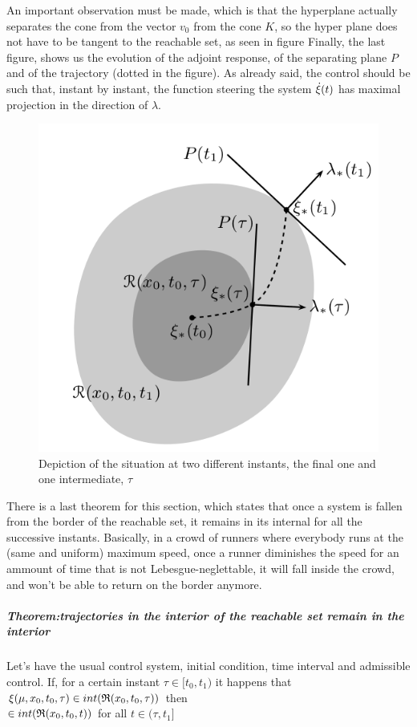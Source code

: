 An important observation must be made, which is that the hyperplane actually separates the cone from the vector $v_0$ from the cone $K$, so the hyper plane does not have to be tangent to the reachable set, as seen in figure %
Finally, the last figure, shows us the evolution of the adjoint response, of the separating plane $P$ and of the trajectory (dotted in the figure). As already said, the control should be such that, instant by instant, the function steering the system $\dot{\xi}(t)$ has maximal projection in the direction of $\lambda$.
\begin{figure}[h!]
	\includegraphics[width=\linewidth]{imgs/5-3-R.png}
	\caption{Depiction of the situation at two different instants, the final one and one intermediate, $\tau$}
\end{figure}
There is a last theorem for this section, which states that once a system is fallen from the border of the reachable set, it remains in its internal for all the successive instants. Basically, in a crowd of runners where everybody runs at the (same and uniform) maximum speed, once a runner diminishes the speed for an ammount of time that is not Lebesgue-neglettable, it will fall inside the crowd, and won't be able to return on the border anymore. 

\subparagraph[5.17]{Theorem:trajectories in the interior of the reachable set remain in the interior} Let's have the usual control system, initial condition, time interval and admissible control. If, for a certain instant $\tau\in[t_0,t_1)$ it happens that $\xi(\mu,x_0,t_0,\tau)\in int(\mathfrak{R}(x_0,t_0,\tau))$ then\\
$\in int(\mathfrak{R}(x_0,t_0,t))$ for all $t\in(\tau,t_1]$



